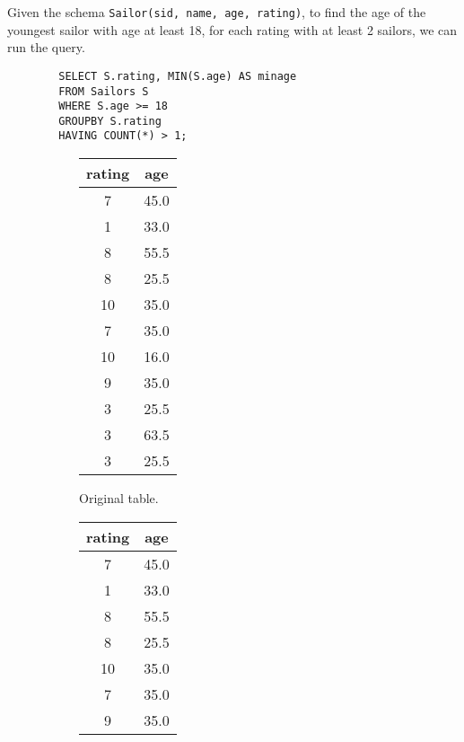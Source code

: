     \begin{example}
      Given the schema \texttt{Sailor(sid, name, age, rating)}, to find the age of the youngest sailor with age at least 18, for each rating with at least 2 sailors, we can run the query. 
      \begin{lstlisting}
        SELECT S.rating, MIN(S.age) AS minage 
        FROM Sailors S 
        WHERE S.age >= 18
        GROUPBY S.rating 
        HAVING COUNT(*) > 1; 
      \end{lstlisting}

      \begin{figure}[H]
        \centering
        \begin{subfigure}[b]{0.32\textwidth}
          \centering
          \begin{tabular}{|c|c|}
            \hline
            rating & age \\
            \hline
            7 & 45.0 \\
            1 & 33.0 \\
            8 & 55.5 \\
            8 & 25.5 \\
            10 & 35.0 \\
            7 & 35.0 \\
            10 & 16.0 \\
            9 & 35.0 \\
            3 & 25.5 \\
            3 & 63.5 \\
            3 & 25.5 \\
            \hline
          \end{tabular}
          \caption{Original table.}
          \label{fig:table1}
        \end{subfigure}
        \hfill 
        \begin{subfigure}[b]{0.32\textwidth}
          \centering
          \begin{tabular}{|c|c|}
            \hline
            rating & age \\
            \hline
            7 & 45.0 \\
            1 & 33.0 \\
            8 & 55.5 \\
            8 & 25.5 \\
            10 & 35.0 \\
            7 & 35.0 \\
            9 & 35.0 \\

\end{tabular}
\end{subfigure}
\end{figure}
\end{example}

